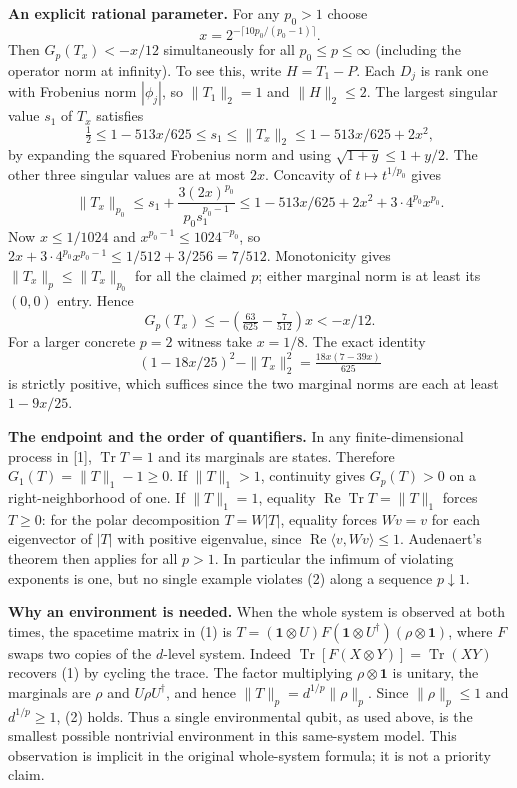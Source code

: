 \documentclass[11pt]{article}
\newcommand{\Tr}{\operatorname{Tr}}\newcommand{\1}{\mathbf1}\newcommand{\ket}[1]{|#1\rangle}\newcommand{\bra}[1]{\langle #1|}
\begin{document}
\textbf{An explicit rational parameter.} For any $p_0>1$ choose
\[
 x=2^{-\lceil10p_0/(p_0-1)\rceil}.                                           \tag{3}
\]
Then $G_p(T_x)<-x/12$ simultaneously for all $p_0\le p\le\infty$ (including the operator norm at infinity). To see this, write $H=T_1-P$. Each $D_j$ is rank one with Frobenius norm $|\phi_j|$, so $\|T_1\|_2=1$ and $\|H\|_2\le2$. The largest singular value $s_1$ of $T_x$ satisfies
\[
 \tfrac12 \le 1-513x/625 \le s_1
 \le\|T_x\|_2\le 1-513x/625+2x^2,
\]
by expanding the squared Frobenius norm and using $\sqrt{1+y}\le 1+y/2$. The other three singular values are at most $2x$. Concavity of $t\mapsto t^{1/p_0}$ gives
\[
 \|T_x\|_{p_0}\le s_1+\frac{3(2x)^{p_0}}{p_0s_1^{p_0-1}}
 \le 1-513x/625+2x^2+3\cdot4^{p_0}x^{p_0}.
\]
\newpage
Now $x\le1/1024$ and $x^{p_0-1}\le 1024^{-p_0}$, so $2x+3\cdot4^{p_0}x^{p_0-1}\le1/512+3/256=7/512$. Monotonicity gives $\|T_x\|_p\le\|T_x\|_{p_0}$ for all the claimed $p$; either marginal norm is at least its $(0,0)$ entry. Hence
\[
 G_p(T_x)\le-\left(\tfrac{63}{625}-\tfrac7{512}\right)x<-x/12.
\]
For a larger concrete $p=2$ witness take $x=1/8$. The exact identity
\[
 (1-18x/25)^2-\|T_x\|_2^2
 =\tfrac{18x(7-39x)}{625}
\]
is strictly positive, which suffices since the two marginal norms are each at least $1-9x/25$.

\textbf{The endpoint and the order of quantifiers.} In any finite-dimensional process in [1], $\Tr T=1$ and its marginals are states. Therefore $G_1(T)=\|T\|_1-1\ge0$. If $\|T\|_1>1$, continuity gives $G_p(T)>0$ on a right-neighborhood of one. If $\|T\|_1=1$, equality $\operatorname{Re}\Tr T=\|T\|_1$ forces $T\ge0$: for the polar decomposition $T=W|T|$, equality forces $Wv=v$ for each eigenvector of $|T|$ with positive eigenvalue, since $\operatorname{Re}\langle v,Wv\rangle\le1$. Audenaert's theorem then applies for all $p>1$. In particular the infimum of violating exponents is one, but no single example violates (2) along a sequence $p\downarrow1$.

\textbf{Why an environment is needed.} When the whole system is observed at both times, the spacetime matrix in (1) is $T=(\1\otimes U)F(\1\otimes U^\dagger)(\rho\otimes\1)$, where $F$ swaps two copies of the $d$-level system. Indeed $\Tr[F(X\otimes Y)]=\Tr(XY)$ recovers (1) by cycling the trace. The factor multiplying $\rho\otimes\1$ is unitary, the marginals are $\rho$ and $U\rho U^\dagger$, and hence $\|T\|_p=d^{1/p}\|\rho\|_p$. Since $\|\rho\|_p\le1$ and $d^{1/p}\ge1$, (2) holds. Thus a single environmental qubit, as used above, is the smallest possible nontrivial environment in this same-system model. This observation is implicit in the original whole-system formula; it is not a priority claim.
\end{document}
